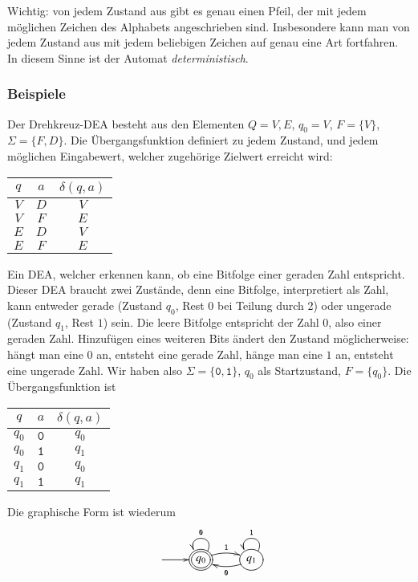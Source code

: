 Wichtig: von jedem Zustand aus gibt es genau einen Pfeil, der mit jedem möglichen
Zeichen des Alphabets angeschrieben sind.
Insbesondere kann man von jedem
Zustand aus mit jedem beliebigen Zeichen auf genau eine Art fortfahren.
%
In diesem Sinne ist der Automat {\em deterministisch}.

\subsubsection{Beispiele}
\begin{beispiel}[\bf Drehkreuz]
Der Drehkreuz-DEA besteht aus den Elementen $Q={V,E}$, $q_0=V$,
$F=\{V\}$, $\Sigma=\{F,D\}$.
Die Übergangsfunktion definiert zu jedem Zustand, und jedem möglichen
Eingabewert, welcher zugehörige Zielwert erreicht wird:
\begin{center}
\begin{tabular}{|cc|c|}
\hline
$q$&$a$&$\delta(q,a)$\\
\hline
$V$&$D$&$V$\\
$V$&$F$&$E$\\
$E$&$D$&$V$\\
$E$&$F$&$E$\\
\hline
\end{tabular}
\end{center}
\end{beispiel}
\begin{beispiel}
Ein DEA, welcher erkennen kann, ob eine Bitfolge einer geraden Zahl entspricht.
Dieser DEA braucht zwei Zustände, denn eine Bitfolge, interpretiert
als Zahl, kann entweder gerade (Zustand $q_0$, Rest $0$ bei Teilung durch 2)
oder ungerade (Zustand $q_1$, Rest $1$) sein.
Die leere Bitfolge entspricht der Zahl $0$, also einer geraden Zahl.
Hinzufügen eines weiteren
Bits ändert den Zustand möglicherweise: hängt man eine $0$ an, entsteht
eine gerade Zahl, hänge man eine $1$ an, entsteht eine ungerade Zahl.
Wir haben also $\Sigma=\{\texttt{0},\texttt{1}\}$, $q_0$ als Startzustand,
$F=\{q_0\}$.
Die Übergangsfunktion ist
\begin{center}
\begin{tabular}{|cc|c|}
\hline
$q$&$a$&$\delta(q,a)$\\
\hline
$q_0$&$\texttt{0}$&$q_0$\\
$q_0$&$\texttt{1}$&$q_1$\\
$q_1$&$\texttt{0}$&$q_0$\\
$q_1$&$\texttt{1}$&$q_1$\\
\hline
\end{tabular}
\end{center}
Die graphische Form ist wiederum
\[
\entrymodifiers={++[o][F]}
\xymatrix{
*+\txt{}\ar[r]
	&*++[o][F=]{q_0} \ar@/^/[r]^{\texttt{1}} \ar@(ur,ul)_{\texttt{0}}
		&{q_1} \ar@/^/[l]^{\texttt{0}} \ar@(ur,ul)_{\texttt{1}}
}
\]
\end{beispiel}
